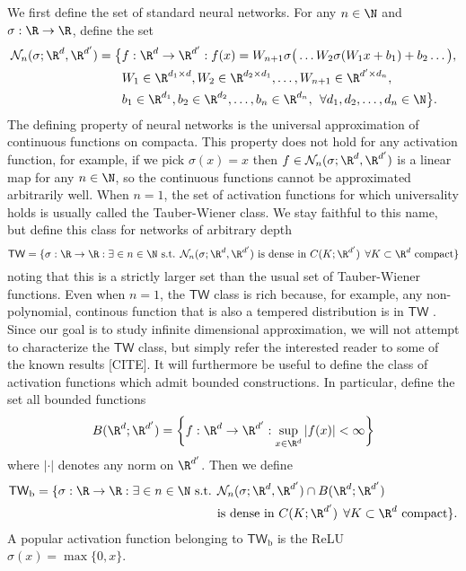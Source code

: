 We first define the set of standard neural networks. For  any \(n \in \N\) and \(\sigma : \R \to \R\), define the set
\begin{align*}
\mathcal{N}_n(\sigma;\R^d, \R^{d'}) = \big \{ &f : \R^{d} \to \R^{d'} : f(x) = W_{n+1} \sigma \big ( \dots W_2 \sigma (W_1 x +b_1) +b_2 \dots \big ), \\
&W_1 \in \R^{d_1 \times d}, W_2 \in \R^{d_2 \times d_1}, \dots, W_{n+1} \in \R^{d' \times d_{n}}, \\
&b_1 \in \R^{d_1}, b_2 \in \R^{d_2}, \dots, b_n \in \R^{d_n}, \:\: \forall d_1,d_2,\dots,d_n \in \N\big \}. 
\end{align*}
The defining property of neural networks is the universal approximation of continuous functions on compacta. This property does not hold for any activation function, for example, if we pick \(\sigma (x) = x\) then \(f \in \mathcal{N}_n (\sigma;\R^d, \R^{d'})\) is a linear map for any \(n \in \N\), so the continuous functions cannot be approximated arbitrarily well. When \(n=1\), the set of activation functions for which universality holds is usually called the Tauber-Wiener class. We stay faithful to this name, but define this class for networks of arbitrary depth
\[\mathsf{TW} = \{\sigma : \R \to \R : \exists \in n \in \N \text{ s.t. } \mathcal{N}_n(\sigma; \R^{d},\R^{d'}) \text{ is dense in } C(K;\R^{d'}) \:\: \forall K \subset \R^d \text{ compact}\}\]
noting that this is a strictly larger set than the usual set of Tauber-Wiener functions. Even when \(n = 1\), the \(\mathsf{TW}\) class is rich because, for example, any non-polynomial, continous function that is also a tempered distribution is in \(\mathsf{TW}\) \cite[Theorem 1]{chen1995universal}. Since our goal is to study infinite dimensional approximation, we will not attempt to characterize the \(\mathsf{TW}\) class, but simply refer the interested reader to some of the known results [CITE]. It will furthermore be useful to define the class of activation functions which admit bounded constructions. In particular, define the set all bounded functions
\[B(\R^d;\R^{d'}) = \bigg \{f : \R^d \to \R^{d'} : \sup_{x \in \R^d} |f(x)| < \infty \bigg \}\]
where \(|\cdot|\) denotes any norm on \(\R^{d'}\). Then we define
\begin{align*}
    \mathsf{TW}_{\text{b}} = \{\sigma : \R \to \R : \exists \in n \in \N \text{ s.t. } &\mathcal{N}_n(\sigma; \R^{d},\R^{d'}) \cap B(\R^d;\R^{d'}) \\
    &\text{is dense in } C(K;\R^{d'}) \:\: \forall K \subset \R^d \text{ compact}\}.
\end{align*}
A popular activation function belonging to \(\mathsf{TW}_{\text{b}}\) is the ReLU \(\sigma (x) = \max \{0,x\}\).

